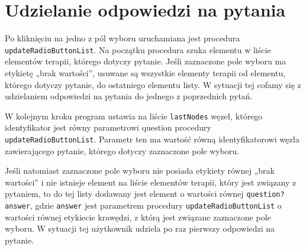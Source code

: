 \section{Udzielanie odpowiedzi na pytania}

Po kliknięciu na jedno z pól wyboru uruchamiana jest procedura \texttt{updateRadioButtonList}. Na początku procedura szuka elementu w liście elementów terapii, którego dotyczy pytanie. Jeśli zaznaczone pole wyboru ma etykietę „brak wartości”, usuwane są wszystkie elementy terapii od elementu, którego dotyczy pytanie, do ostatniego elementu listy. W sytuacji tej cofamy się z udzielaniem odpowiedzi na pytania do jednego z poprzednich pytań.

W kolejnym kroku program ustawia na liście \texttt{lastNodes} węzeł, którego identyfikator jest równy parametrowi question procedury \texttt{updateRadioButtonList}. 
Parametr ten ma wartość równą identyfikatorowi węzła zawierającego pytanie, którego dotyczy zaznaczone pole wyboru. 


Jeśli natomiast zaznaczone pole wyboru nie posiada etykiety równej „brak wartości” i nie istnieje element na liście elementów terapii, który jest związany z pytaniem, to do tej listy dodawany jest element o wartości równej \texttt{question?answer}, gdzie \texttt{answer} jest parametrem procedury \texttt{updateRadioButtonList} o wartości równej etykiecie krawędzi, z którą jest związane zaznaczone pole wyboru. W sytuacji tej użytkownik udziela po raz pierwszy odpowiedzi na pytanie. 

